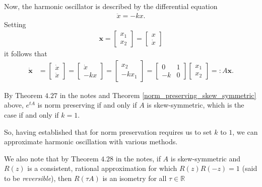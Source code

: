 \documentclass{article}
\theoremstyle{definition}
\begin{document}
\begin{itemize}
		Now, the harmonic oscillator is described by the differential
		equation
		\begin{align*}
			\ddot{x} = -kx.
		\end{align*}
		Setting
		\begin{align*}
			\mathbf{x} = \begin{bmatrix}
				x_1 \\
				x_2
			\end{bmatrix} = \begin{bmatrix}
				x \\
				\dot{x}
			\end{bmatrix}
		\end{align*}
		it follows that
		\begin{align*}
			\mathbf{\dot{x}} &=
			\begin{bmatrix}
				\dot{x} \\
				\ddot{x}
			\end{bmatrix} =
			\begin{bmatrix}
				\dot{x} \\
				-kx
			\end{bmatrix} =
			\begin{bmatrix}
				x_2 \\
				-kx_1
			\end{bmatrix}
			=
			\begin{bmatrix}
				0 & 1 \\
				-k & 0
			\end{bmatrix}
			\begin{bmatrix}
				x_1 \\
				x_2
			\end{bmatrix} =:
			A \mathbf{x}.
		\end{align*}

		By Theorem $4.27$ in the notes and Theorem
		\ref{norm_preserving_skew_symmetric} above, $e^{tA}$ is norm
		preserving if and only if $A$ is skew-symmetric, which is the
		case if and only if $k = 1$.

		So, having established that for norm preservation requires us to
		set $k$ to $1$, we can approximate harmonic oscillation with
		various methods.

		We also note that by Theorem $4.28$ in the notes, if $A$ is
		skew-symmetric and $R(z)$ is a consistent, rational
		approximation for which $R(z)R(-z) = 1$ (said to be
		\emph{reversible}), then $R(\tau A)$ is an
		isometry for all $\tau \in \mathbb{R}$


\end{itemize}
\end{document}
